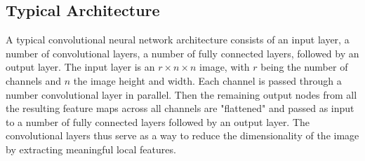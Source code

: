 \subsection{Typical Architecture}

\noindent A typical convolutional neural network architecture consists of an input layer, a number of convolutional layers, a number of fully connected layers, followed by an output layer. The input layer is an $r \times n \times n$ image, with $r$ being the number of channels and $n$ the image height and width. Each channel is passed through a number convolutional layer in parallel. Then the remaining output nodes from all the resulting feature maps across all channels are "flattened" and passed as input to a number of fully connected layers followed by an output layer. The convolutional layers thus serve as a way to reduce the dimensionality of the image by extracting meaningful local features.







